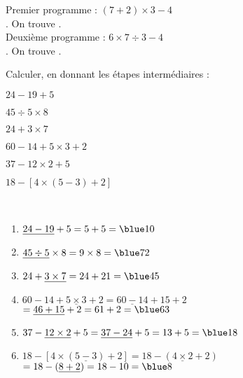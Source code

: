 \begin{colonne*exercice}
\begin{corrige}
   Premier programme : {\blue $(7 + 2)\times3-4$} \\ [1mm]
   . On trouve {}. \\
   Deuxième programme :  {\blue $6\times7\div3-4$} \\ [1mm]
   . On trouve {}.
\end{corrige}

\bigskip


\begin{exercice} %
  Calculer, en donnant les étapes intermédiaires :
   \begin{colenumerate}{2}
      \item $24-19+5$ \smallskip
      \item $45\div5\times8$ \smallskip
      \item $24+3\times7$
      \item $60-14+5\times3+2$
      \item $37-12\times2+5$
      \item $18-[4\times(5-3)+2]$
\end{colenumerate}
\end{exercice}

\begin{corrige}
   \ \\ [-5mm]
   \begin{enumerate}
      \item $\underline{24-19}+5 =5+5 =\blue 10$ \smallskip
      \item $\underline{45\div5}\times8 =9\times8 =\blue 72$ \smallskip
      \item $24+\underline{3\times7} =24+21 =\blue 45$ \smallskip
      \item $60-14+\underline{5\times3}+2 =\underline{60-14}+15+2$ \\
         \hspace*{33mm} $=\underline{46+15}+2 =61+2 =\blue 63$ \smallskip
      \item $37-\underline{12\times2}+5 =\underline{37-24}+5 =13+5 =\blue 18$ \smallskip
      \item $18-[4\times(\underline{5-3})+2] =18-(\underline{4\times2}+2)$ \\
         \hspace*{35.6mm} $=18-(\underline{8+2}) =18-10 =\blue 8$
   \end{enumerate}
\end{corrige}


\end{colonne*exercice}
